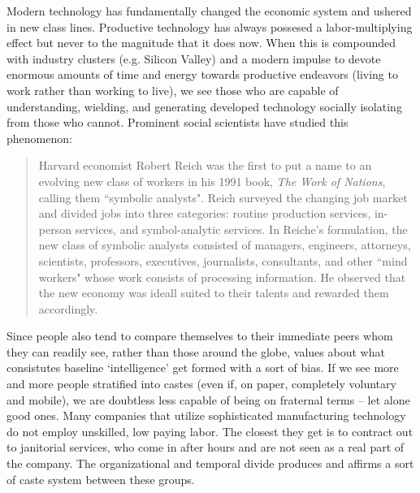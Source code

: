 \documentclass[letterpaper]{article}
\begin{document}
    Modern technology has fundamentally changed the economic system and ushered in new class lines. Productive technology has always possesed a labor-multiplying effect but never to the magnitude that it does now. When this is compounded with industry clusters (e.g. Silicon Valley) and a modern impulse to devote enormous amounts of time and energy towards productive endeavors (living to work rather than working to live), we see those who are capable of understanding, wielding, and generating developed technology socially isolating from those who cannot. Prominent social scientists have studied this phenomenon:

    \begin{quote}
      Harvard economist Robert Reich was the first to put a name to an evolving new class of workers in his 1991 book, \textit{The Work of Nations}, calling them ``symbolic analysts". Reich surveyed the changing job market and divided jobs into three categories: routine production services, in-person services, and symbol-analytic services. In Reiche's formulation, the new class of symbolic analysts consisted of managers, engineers, attorneys, scientists, professors, executives, journalists, consultants, and other ``mind workers" whose work consists of processing information. He observed that the new economy was ideall suited to their talents and rewarded them accordingly.
    \end{quote}


    Since people also tend to compare themselves to their immediate peers whom they can readily see, rather than those around the globe, values about what consistutes baseline `intelligence' get formed with a sort of bias. If we see more and more people stratified into castes (even if, on paper, completely voluntary and mobile), we are doubtless less capable of being on fraternal terms -- let alone good ones. Many companies that utilize sophisticated manufacturing technology do not employ unskilled, low paying labor. The closest they get is to contract out to janitorial services, who come in after hours and are not seen as a real part of the company. The organizational and temporal divide produces and affirms a sort of caste system between these groups.
\end{document}
